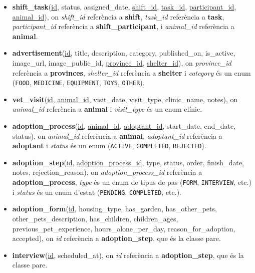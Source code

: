 \documentclass[11pt,a4paper]{report}
\begin{document}
\begin{itemize}
    \item \textbf{shift\_task}(\underline{id}, status, assigned\_date, \underline{shift\_id}, \underline{task\_id}, \underline{participant\_id}, \underline{animal\_id}), on \textit{shift\_id} referència a \textbf{shift}, \textit{task\_id} referència a \textbf{task}, \textit{participant\_id} referència a \textbf{shift\_participant}, i \textit{animal\_id} referència a \textbf{animal}.
    
    \item \textbf{advertisement}(\underline{id}, title, description, category, published\_on, is\_active, image\_url, image\_public\_id, \underline{province\_id}, \underline{shelter\_id}), on \textit{province\_id} referència a \textbf{provinces}, \textit{shelter\_id} referència a \textbf{shelter} i \textit{category} és un enum (\texttt{FOOD}, \texttt{MEDICINE}, \texttt{EQUIPMENT}, \texttt{TOYS}, \texttt{OTHER}).
    
    \item \textbf{vet\_visit}(\underline{id}, \underline{animal\_id}, visit\_date, visit\_type, clinic\_name, notes), on \textit{animal\_id} referència a \textbf{animal} i \textit{visit\_type} és un enum clínic.
    
    \item \textbf{adoption\_process}(\underline{id}, \underline{animal\_id}, \underline{adoptant\_id}, start\_date, end\_date, status), on \textit{animal\_id} referència a \textbf{animal}, \textit{adoptant\_id} referència a \textbf{adoptant} i \textit{status} és un enum (\texttt{ACTIVE}, \texttt{COMPLETED}, \texttt{REJECTED}).
    
    \item \textbf{adoption\_step}(\underline{id}, \underline{adoption\_process\_id}, type, status, order, finish\_date, notes, rejection\_reason), on \textit{adoption\_process\_id} referència a \textbf{adoption\_process}, \textit{type} és un enum de tipus de pas (\texttt{FORM}, \texttt{INTERVIEW}, etc.) i \textit{status} és un enum d'estat (\texttt{PENDING}, \texttt{COMPLETED}, etc.).
    
    \item \textbf{adoption\_form}(\underline{id}, housing\_type, has\_garden, has\_other\_pets, other\_pets\_description, has\_children, children\_ages, previous\_pet\_experience, hours\_alone\_per\_day, reason\_for\_adoption, accepted), on \textit{id} referència a \textbf{adoption\_step}, que és la classe pare.
    
    \item \textbf{interview}(\underline{id}, scheduled\_at), on \textit{id} referència a \textbf{adoption\_step}, que és la classe pare.
    

\end{itemize}
\end{document}
